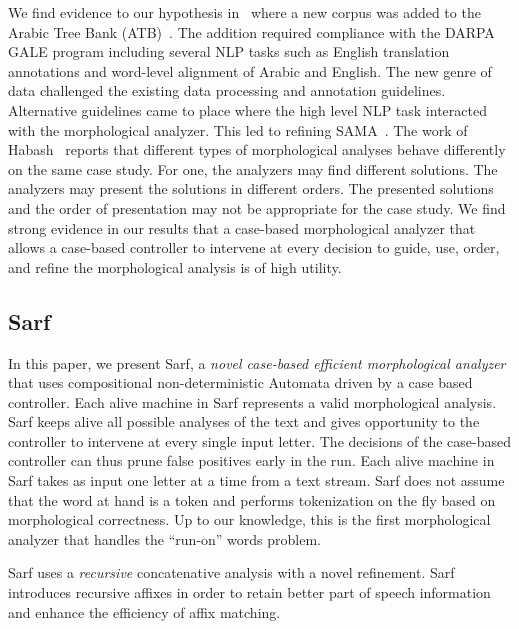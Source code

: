 \documentclass[11pt]{article}
\begin{document}
We find evidence to our hypothesis in~\cite{Maamouri:10} where 
a new corpus was added to the Arabic Tree Bank 
(ATB)~\cite{Maamouri:04}. 
The addition required compliance with the DARPA GALE program 
including several NLP tasks such as English translation 
annotations and word-level alignment of Arabic and English. 
The new genre of data challenged the existing data processing and 
annotation guidelines. 
Alternative guidelines came to place where the high level NLP 
task interacted with the morphological analyzer. 
This led to refining SAMA~\cite{Kulick:10}. 
The work of Habash~ reports that different 
types of morphological analyses behave differently on the same case 
study. 
For one, the analyzers may find different solutions. 
The analyzers may present the solutions in different orders. 
The presented solutions and the order of presentation may not be 
appropriate for the case study. 
We find strong evidence in our results 
that a case-based morphological analyzer that allows a case-based 
controller to intervene at every decision to guide, use, order, and 
refine the morphological analysis is of high utility.

\subsection{Sarf}
\label{sec:intro:sarf}

In this paper, we present Sarf, a {\em novel case-based efficient
morphological analyzer} that uses compositional 
non-deterministic Automata driven by a case based controller.
Each alive machine in Sarf represents a valid morphological analysis. 
Sarf keeps alive all possible analyses of the text and gives 
opportunity to the controller to intervene at every single input 
letter. 
The decisions of the case-based controller can thus prune false 
positives early in the run. 
Each alive machine in Sarf takes as input one letter at a time 
from a text stream. 
Sarf does not assume that the word at hand is a token and
performs tokenization on the fly based on morphological correctness.
Up to our knowledge, this is the first morphological analyzer that 
handles the ``run-on'' words problem. 

Sarf uses a {\em recursive} concatenative analysis with a novel 
refinement. 
Sarf introduces recursive affixes in order to
retain better part of speech information and enhance the 
efficiency of affix matching. 


\transfalse
\begin{figure}[tb]
\end{figure}
\transtrue
\end{document}
